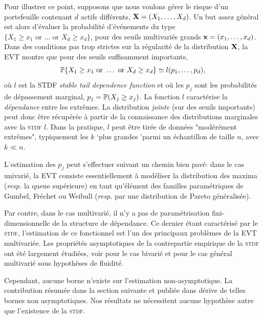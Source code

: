 Pour illustrer ce point, supposons que nous voulons gérer le risque d'un portefeuille contenant $ d $ actifs différents, $ \mb X = (X_1, \ldots, X_d) $. Un but assez général est alors d'évaluer la probabilité d'événements du type
 $\{X_1 \ge x_1 \text{ or }  \dotsc \text{ or } X_d\ge x_d \}$, 
pour des seuils multivariés grands $\mb x=(x_1,\ldots,x_d)$. Dans des conditions pas trop strictes sur la régularité de la distribution $ \mb X $, la \textsc {EVT} montre que pour des seuils suffisamment importants,
\[
\P\{X_1 \ge x_1 \text{ or }  \dotsc \text{ or }
X_d\ge x_d \} \simeq 
l(p_1,\ldots,p_d), 
\] 
où $ l $ est la STDF \emph{stable tail dependence function} et où les $ p_j $  sont les probabilités de dépassement marginal, $ p_j = \P (X_j \ge x_j) $. La fonction $ l $ caractérise la \emph {dépendance} entre les extrêmes. La distribution \emph {jointe} (sur des seuils importants) peut donc être récupérée à partir de la connaissance des distributions marginales avec la \textsc {stdf} $ l $. Dans la pratique, $ l $ peut être tirée de données "modérément extrêmes", typiquement les $ k $ `plus grandes 'parmi un échantillon de taille $ n $, avec $ k \ll n $.

L'estimation des $ p_j $ peut s'effectuer suivant un chemin bien pavé: dans le cas univarié, la \textsc {EVT} consiste essentiellement à modéliser la distribution des maxima (\emph {resp.} la queue supérieure) en tant qu'élément des familles paramétriques de Gumbel, Fréchet ou Weibull (\emph {resp.} par une distribution de Pareto généralisée).

Par contre, dans le cas multivarié, il n'y a pas de paramétrisation fini-dimensionnelle de la structure de dépendance.
Ce dernier étant caractérisé par le \textsc {stdf}, l'estimation de ce fonctionnel est l'un des principaux problèmes de la \textsc {EVT} multivariée. Les propriétés asymptotiques de la contrepartie empirique de la \textsc {stdf} ont été largement étudiées, voir \cite {Huangphd, Drees98, Embrechts2000, dHF06} pour le cas bivarié et \cite {Qi97, Einmahl2012} pour le cas général multivarié sous hypothèses de fluidité.

Cependant, aucune borne n'existe sur l'estimation non-asymptotique. La contribution résumée dans la section suivante et publiée dans \cite{COLT15} dérive de telles bornes non asymptotiques. Nos résultats ne nécessitent aucune hypothèse autre que l'existence de la \textsc {stdf}.


